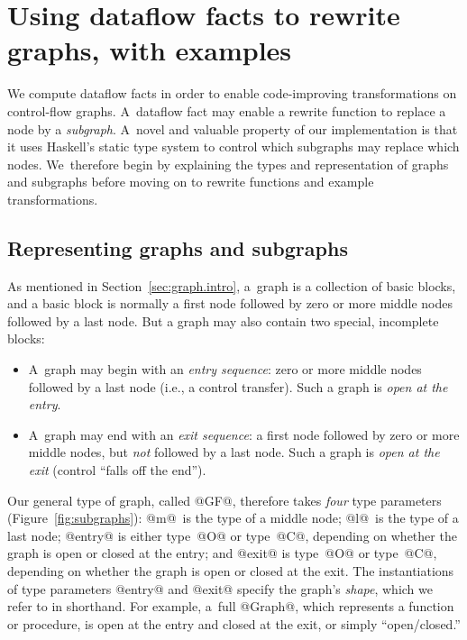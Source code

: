 \documentclass[blockstyle,preprint,natbib,nocopyrightspace]{sigplanconf}
\newcommand\secref[1]{Section~\ref{sec:#1}}
\newcommand\seclabel[1]{\label{sec:#1}}
\newcommand\figref[1]{Figure~\ref{fig:#1}}
\begin{document}
\section{Using dataflow facts to rewrite graphs\ifpagetuning\else, with examples\fi}

\seclabel{rewrites}

\seclabel{example-rewrites}


We compute dataflow facts in order to enable code-improving
transformations on control-flow graphs.
A~dataflow fact may enable a rewrite function to replace a node by a
\emph{subgraph}. 
A~novel and valuable property of our implementation is that it uses
Haskell's static type system to control which subgraphs may replace
which nodes.
We~therefore begin by explaining the types and representation of
graphs and subgraphs before moving on to rewrite functions and example
transformations. 

\subsection{Representing graphs and subgraphs}

\seclabel{subgraphs}

As mentioned in \secref{graph.intro},
a~graph is a collection of basic blocks, 
and a basic block is normally a first node followed by zero or
more middle nodes followed by a last node.
But
a graph may also contain two special, incomplete
blocks:
\begin{itemize}
\item
A~graph may begin with 
an \emph{entry sequence}: zero or more middle nodes
followed by a last node (i.e., a control transfer).
Such a graph is \emph{open at the entry}.  


\item
A~graph may end with
an \emph{exit sequence}: a first node followed by zero or more
middle nodes, but \emph{not} followed by a last node.
Such a graph is \emph{open at the exit} 
(control ``falls
off the end'').
\end{itemize}
Our general type of graph, called @GF@, therefore takes \emph{four}
type parameters (\figref{subgraphs}):
@m@~is the type of a middle node;
@l@~is the type of a last node;
@entry@ is either type~@O@ or type~@C@, depending on whether the graph
is open or closed at the entry;
and
@exit@ is type~@O@ or type~@C@, depending on whether the graph
is open or closed at the exit.
The instantiations of type parameters @entry@ and @exit@ specify the
graph's \emph{shape}, which we refer to in shorthand.
For example,
a~full @Graph@, which represents a function or
procedure, is open at the entry and closed at the exit, or
simply ``open/closed.''
\end{document}
